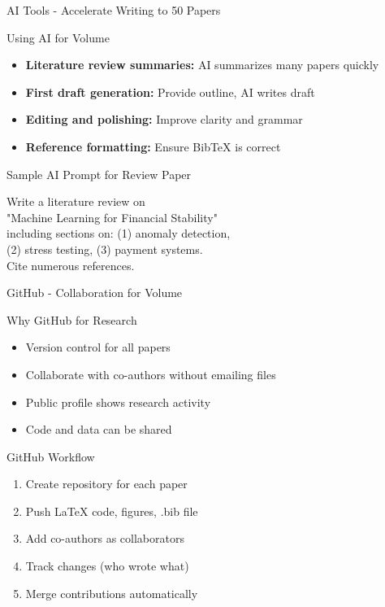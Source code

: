 \documentclass[11pt]{beamer}
\begin{document}
	\begin{frame}{AI Tools - Accelerate Writing to 50 Papers}
		\scriptsize
		\begin{block}{Using AI for Volume}
			\begin{itemize}
				\item \textbf{Literature review summaries:} AI summarizes many papers quickly
				\item \textbf{First draft generation:} Provide outline, AI writes draft
				\item \textbf{Editing and polishing:} Improve clarity and grammar
				\item \textbf{Reference formatting:} Ensure BibTeX is correct
			\end{itemize}
		\end{block}
		\begin{block}{Sample AI Prompt for Review Paper}
			\begin{center}
				\ttfamily
				Write a literature review on \\
				"Machine Learning for Financial Stability" \\
				including sections on: (1) anomaly detection, \\
				(2) stress testing, (3) payment systems. \\
				Cite numerous references.
			\end{center}
		\end{block}
	\end{frame}
	
	\begin{frame}{GitHub - Collaboration for Volume}
		\scriptsize
		\begin{block}{Why GitHub for Research}
			\begin{itemize}
				\item Version control for all papers
				\item Collaborate with co-authors without emailing files
				\item Public profile shows research activity
				\item Code and data can be shared
			\end{itemize}
		\end{block}
		\begin{block}{GitHub Workflow}
			\begin{enumerate}
				\item Create repository for each paper
				\item Push LaTeX code, figures, .bib file
				\item Add co-authors as collaborators
				\item Track changes (who wrote what)
				\item Merge contributions automatically
			\end{enumerate}
		\end{block}
	\end{frame}
	
\end{document}
